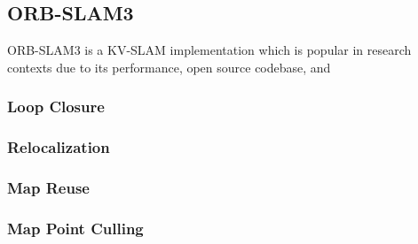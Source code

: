 \subsection{ORB-SLAM3}

ORB-SLAM3 is a KV-SLAM implementation which is popular in research contexts due to its performance, open source codebase, and 

\subsubsection{Loop Closure}
\subsubsection{Relocalization}
\subsubsection{Map Reuse}
\subsubsection{Map Point Culling}